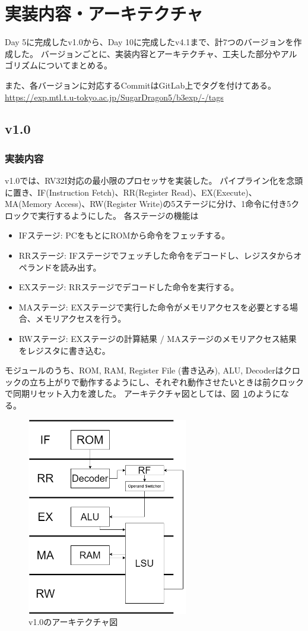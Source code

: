 \documentclass[dvipdfmx,10pt,a4paper,titlepage]{jsarticle}
\begin{document}
    \section{実装内容・アーキテクチャ}
    Day 5に完成したv1.0から、Day 10に完成したv4.1まで、計7つのバージョンを作成した。
    バージョンごとに、実装内容とアーキテクチャ、工夫した部分やアルゴリズムについてまとめる。

    また、各バージョンに対応するCommitはGitLab上でタグを付けてある。\url{https://exp.mtl.t.u-tokyo.ac.jp/SugarDragon5/b3exp/-/tags}
    \subsection{v1.0}
    \subsubsection{実装内容}
    v1.0では、RV32I対応の最小限のプロセッサを実装した。
    パイプライン化を念頭に置き、IF(Instruction Fetch)、RR(Register Read)、EX(Execute)、MA(Memory Access)、RW(Register Write)の5ステージに分け、1命令に付き5クロックで実行するようにした。
    各ステージの機能は
    \begin{itemize}
        \item IFステージ: PCをもとにROMから命令をフェッチする。
        \item RRステージ: IFステージでフェッチした命令をデコードし、レジスタからオペランドを読み出す。
        \item EXステージ: RRステージでデコードした命令を実行する。
        \item MAステージ: EXステージで実行した命令がメモリアクセスを必要とする場合、メモリアクセスを行う。
        \item RWステージ: EXステージの計算結果 / MAステージのメモリアクセス結果をレジスタに書き込む。
    \end{itemize}
    モジュールのうち、ROM, RAM, Register File (書き込み), ALU, Decoderはクロックの立ち上がりで動作するようにし、それぞれ動作させたいときは前クロックで同期リセット入力を渡した。
    アーキテクチャ図としては、図~\ref{fig:v1.0}のようになる。
    \begin{figure}[h]
        \centering
        \includegraphics[width=7cm]{figure/v1.0.png}
        \caption{v1.0のアーキテクチャ図}\label{fig:v1.0}
    \end{figure}
\end{document}
